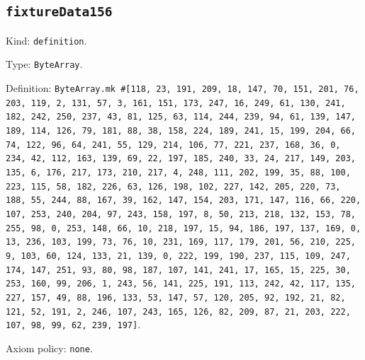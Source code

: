 \documentclass[11pt]{article}
\begin{document}
\subsection*{\texttt{fixtureData156}}
\noindent Kind: \texttt{definition}.\par
\noindent Type: \texttt{ByteArray}.\par
\noindent Definition: \texttt{ByteArray.mk \#[118, 23, 191, 209, 18, 147, 70, 151, 201, 76, 203, 119, 2, 131, 57, 3, 161, 151, 173, 247, 16, 249, 61, 130, 241, 182, 242, 250, 237, 43, 81, 125, 63, 114, 244, 239, 94, 61, 139, 147, 189, 114, 126, 79, 181, 88, 38, 158, 224, 189, 241, 15, 199, 204, 66, 74, 122, 96, 64, 241, 55, 129, 214, 106, 77, 221, 237, 168, 36, 0, 234, 42, 112, 163, 139, 69, 22, 197, 185, 240, 33, 24, 217, 149, 203, 135, 6, 176, 217, 173, 210, 217, 4, 248, 111, 202, 199, 35, 88, 100, 223, 115, 58, 182, 226, 63, 126, 198, 102, 227, 142, 205, 220, 73, 188, 55, 244, 88, 167, 39, 162, 147, 154, 203, 171, 147, 116, 66, 220, 107, 253, 240, 204, 97, 243, 158, 197, 8, 50, 213, 218, 132, 153, 78, 255, 98, 0, 253, 148, 66, 10, 218, 197, 15, 94, 186, 197, 137, 169, 0, 13, 236, 103, 199, 73, 76, 10, 231, 169, 117, 179, 201, 56, 210, 225, 9, 103, 60, 124, 133, 21, 139, 0, 222, 199, 190, 237, 115, 109, 247, 174, 147, 251, 93, 80, 98, 187, 107, 141, 241, 17, 165, 15, 225, 30, 253, 160, 99, 206, 1, 243, 56, 141, 225, 191, 113, 242, 42, 117, 135, 227, 157, 49, 88, 196, 133, 53, 147, 57, 120, 205, 92, 192, 21, 82, 121, 52, 191, 2, 246, 107, 243, 165, 126, 82, 209, 87, 21, 203, 222, 107, 98, 99, 62, 239, 197]}.\par
\noindent Axiom policy: \texttt{none}.\par
\end{document}
